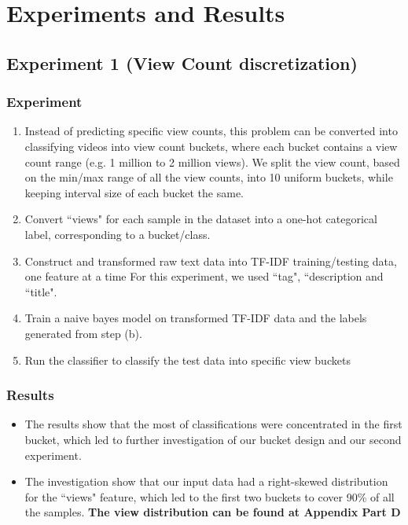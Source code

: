 \documentclass[english]{article}
\begin{document}
\section{Experiments and Results}
\subsection{Experiment 1 (View Count discretization)}
\subsubsection{Experiment}
\begin{enumerate}
\item Instead of predicting specific view counts, this problem can be converted into classifying videos into view count buckets, where each bucket contains a view count range (e.g. 1 million to 2 million views). We split the view count, based on the min/max range of all the view counts, into 10 uniform buckets, while keeping interval size of each bucket the same. 
\item Convert ``views" for each sample in the dataset into a one-hot categorical label, corresponding to a bucket/class.
\item Construct and transformed raw text data into TF-IDF training/testing data, one feature at a time For this experiment, we used ``tag", ``description and ``title". 
\item Train a naive bayes model on transformed TF-IDF data and the labels generated from step (b).
\item Run the classifier to classify the test data into specific view buckets
\end{enumerate}
\subsubsection{Results}
\begin{itemize}
    \item The results show that the most of classifications were concentrated in the first bucket, which led to further investigation of our bucket design and our second experiment.
    \item The investigation show that our input data had a right-skewed distribution for the ``views" feature, which led to the first two buckets to cover 90\% of all the samples.
    \bf{The view distribution can be found at Appendix Part D}
    
\end{itemize}
\end{document}
